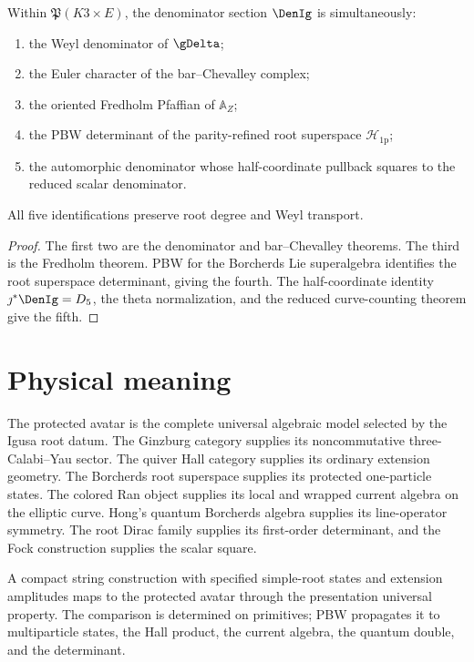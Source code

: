 \begin{theorem}
Within $\mathfrak P(K3\times E)$, the denominator section $\DenIg$ is simultaneously:
\begin{enumerate}
\item the Weyl denominator of $\gDelta$;
\item the Euler character of the bar--Chevalley complex;
\item the oriented Fredholm Pfaffian of $\mathbb A_Z$;
\item the PBW determinant of the parity-refined root superspace $\mathcal H_{\mathrm{1p}}$;
\item the automorphic denominator whose half-coordinate pullback squares to the reduced scalar denominator.
\end{enumerate}
All five identifications preserve root degree and Weyl transport.
\end{theorem}
\begin{proof}
The first two are the denominator and bar--Chevalley theorems.  The third is the Fredholm theorem.  PBW for the Borcherds Lie superalgebra identifies the root superspace determinant, giving the fourth.  The half-coordinate identity $\jmath^*\DenIg=D_5$, the theta normalization, and the reduced curve-counting theorem give the fifth.
\end{proof}

\chapter{Physical meaning}
The protected avatar is the complete universal algebraic model selected by the Igusa root datum.  The Ginzburg category supplies its noncommutative three-Calabi--Yau sector.  The quiver Hall category supplies its ordinary extension geometry.  The Borcherds root superspace supplies its protected one-particle states.  The colored Ran object supplies its local and wrapped current algebra on the elliptic curve.  Hong's quantum Borcherds algebra supplies its line-operator symmetry.  The root Dirac family supplies its first-order determinant, and the Fock construction supplies the scalar square.

A compact string construction with specified simple-root states and extension amplitudes maps to the protected avatar through the presentation universal property.  The comparison is determined on primitives; PBW propagates it to multiparticle states, the Hall product, the current algebra, the quantum double, and the determinant.

